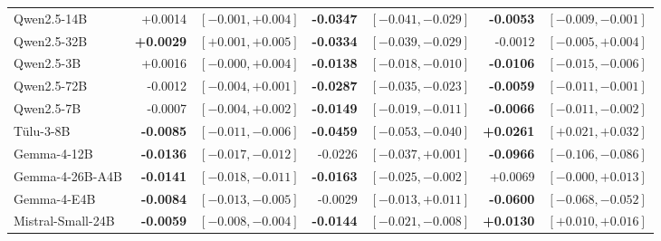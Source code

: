 \begin{table}[tb]
\begin{tabular}{lrlrlrl}
Qwen2.5-14B & +0.0014 & $[-0.001,+0.004]$ & \textbf{-0.0347} & $[-0.041,-0.029]$ & \textbf{-0.0053} & $[-0.009,-0.001]$ \\
Qwen2.5-32B & \textbf{+0.0029} & $[+0.001,+0.005]$ & \textbf{-0.0334} & $[-0.039,-0.029]$ & -0.0012 & $[-0.005,+0.004]$ \\
Qwen2.5-3B & +0.0016 & $[-0.000,+0.004]$ & \textbf{-0.0138} & $[-0.018,-0.010]$ & \textbf{-0.0106} & $[-0.015,-0.006]$ \\
Qwen2.5-72B & -0.0012 & $[-0.004,+0.001]$ & \textbf{-0.0287} & $[-0.035,-0.023]$ & \textbf{-0.0059} & $[-0.011,-0.001]$ \\
Qwen2.5-7B & -0.0007 & $[-0.004,+0.002]$ & \textbf{-0.0149} & $[-0.019,-0.011]$ & \textbf{-0.0066} & $[-0.011,-0.002]$ \\
T\"ulu-3-8B & \textbf{-0.0085} & $[-0.011,-0.006]$ & \textbf{-0.0459} & $[-0.053,-0.040]$ & \textbf{+0.0261} & $[+0.021,+0.032]$ \\
\midrule
Gemma-4-12B & \textbf{-0.0136} & $[-0.017,-0.012]$ & -0.0226 & $[-0.037,+0.001]$ & \textbf{-0.0966} & $[-0.106,-0.086]$ \\
Gemma-4-26B-A4B & \textbf{-0.0141} & $[-0.018,-0.011]$ & \textbf{-0.0163} & $[-0.025,-0.002]$ & +0.0069 & $[-0.000,+0.013]$ \\
Gemma-4-E4B & \textbf{-0.0084} & $[-0.013,-0.005]$ & -0.0029 & $[-0.013,+0.011]$ & \textbf{-0.0600} & $[-0.068,-0.052]$ \\
Mistral-Small-24B & \textbf{-0.0059} & $[-0.008,-0.004]$ & \textbf{-0.0144} & $[-0.021,-0.008]$ & \textbf{+0.0130} & $[+0.010,+0.016]$ \\
\bottomrule
\end{tabular}
\end{table}
